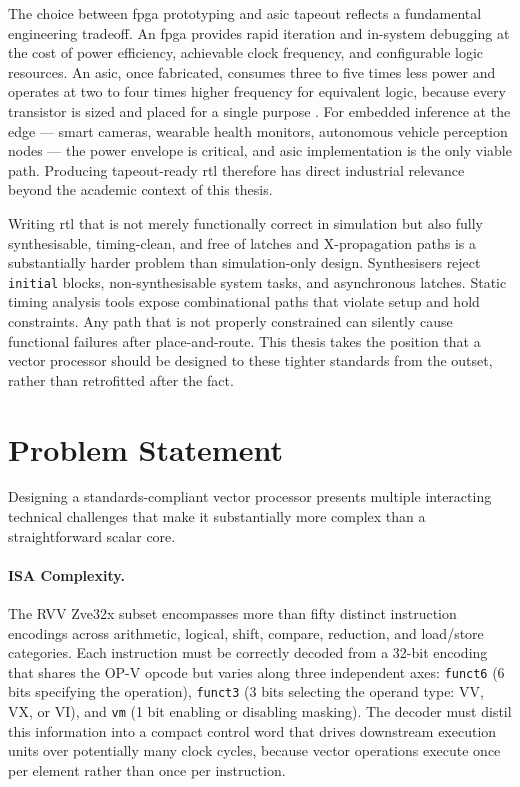 The choice between \gls{fpga} prototyping and \gls{asic} tapeout reflects a fundamental
engineering tradeoff. An \gls{fpga} provides rapid iteration and in-system debugging
at the cost of power efficiency, achievable clock frequency, and configurable logic
resources. An \gls{asic}, once fabricated, consumes three to five times less power and
operates at two to four times higher frequency for equivalent logic, because every
transistor is sized and placed for a single purpose \cite{weste2010cmos}. For embedded
inference at the edge --- smart cameras, wearable health monitors, autonomous vehicle
perception nodes --- the power envelope is critical, and \gls{asic} implementation is
the only viable path. Producing tapeout-ready \gls{rtl} therefore has direct industrial
relevance beyond the academic context of this thesis.

Writing \gls{rtl} that is not merely functionally correct in simulation but also fully
synthesisable, timing-clean, and free of latches and X-propagation paths is a
substantially harder problem than simulation-only design. Synthesisers reject
\texttt{initial} blocks, non-synthesisable system tasks, and asynchronous latches.
Static timing analysis tools expose combinational paths that violate setup and hold
constraints. Any path that is not properly constrained can silently cause functional
failures after place-and-route. This thesis takes the position that a vector processor
should be designed to these tighter standards from the outset, rather than retrofitted
after the fact.

\section{Problem Statement}
\label{sec:problem}

Designing a standards-compliant vector processor presents multiple interacting
technical challenges that make it substantially more complex than a straightforward
scalar core.

\paragraph{ISA Complexity.}
The RVV Zve32x subset encompasses more than fifty distinct instruction encodings across
arithmetic, logical, shift, compare, reduction, and load/store categories. Each
instruction must be correctly decoded from a 32-bit encoding that shares the OP-V
opcode but varies along three independent axes: \texttt{funct6} (6 bits specifying
the operation), \texttt{funct3} (3 bits selecting the operand type: VV, VX, or VI),
and \texttt{vm} (1 bit enabling or disabling masking). The decoder must distil this
information into a compact control word that drives downstream execution units over
potentially many clock cycles, because vector operations execute once per element rather
than once per instruction.

